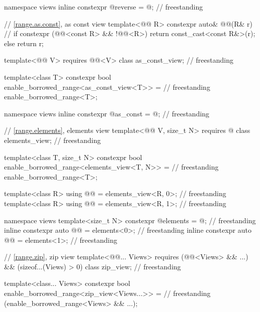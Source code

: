 \begin{codeblock}
{  namespace views { inline constexpr @\unspecnc@ reverse = @\unspecnc@; }           // freestanding

  // \ref{range.as.const}, as const view
  template<@@ R>
    constexpr auto& @@(R& r) {          // \expos
      if constexpr (@@<const R> && !@@<R>) {
        return const_cast<const R&>(r);
      } else {
        return r;
      }
    }

  template<@@ V>
    requires @@<V>
  class as_const_view;                                                              // freestanding

  template<class T>
    constexpr bool enable_borrowed_range<as_const_view<T>> =                        // freestanding
      enable_borrowed_range<T>;

  namespace views { inline constexpr @\unspecnc@ as_const = @\unspecnc@; }          // freestanding

  // \ref{range.elements}, elements view
  template<@@ V, size_t N>
    requires @\seebelow@
  class elements_view;                                                              // freestanding

  template<class T, size_t N>
    constexpr bool enable_borrowed_range<elements_view<T, N>> =                     // freestanding
      enable_borrowed_range<T>;

  template<class R>
    using @@ = elements_view<R, 0>;                                          // freestanding
  template<class R>
    using @@ = elements_view<R, 1>;                                        // freestanding

  namespace views {
    template<size_t N>
      constexpr @\unspecnc@ elements = @\unspecnc@;                                 // freestanding
    inline constexpr auto @@ = elements<0>;                                       // freestanding
    inline constexpr auto @@ = elements<1>;                                     // freestanding
  }

  // \ref{range.zip}, zip view
  template<@@... Views>
    requires (@@<Views> && ...) && (sizeof...(Views) > 0)
  class zip_view;                                                                   // freestanding

  template<class... Views>
    constexpr bool enable_borrowed_range<zip_view<Views...>> =                      // freestanding
      (enable_borrowed_range<Views> && ...);

}
\end{codeblock}
